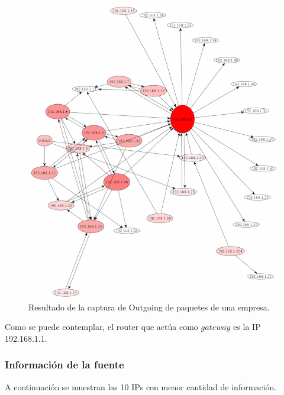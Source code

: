 \documentclass[10pt, a4paper]{article}
\begin{document}
\begin{figure}[H] %
\begin{center}
\includegraphics[width=400pt]{../imgs/tiarg-outgoing.png}
\caption{Resultado de la captura de Outgoing de paquetes de una empresa.}
\end{center}
\end{figure}

Como se puede contemplar, el router que actúa como $gateway$ es la IP 192.168.1.1.

\subsubsection{Información de la fuente}

A continuación se muestran las 10 IPs con menor cantidad de información.
\end{document}
